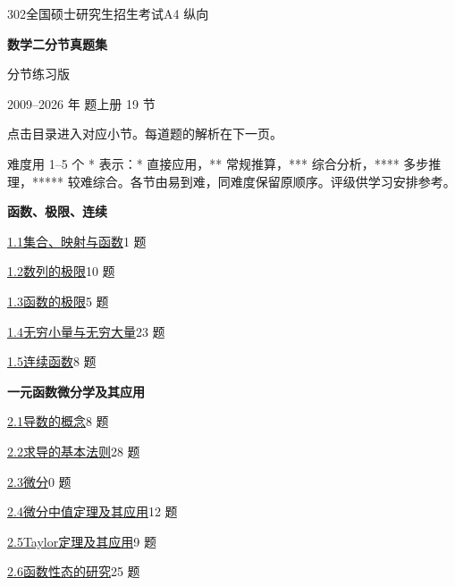 \documentclass[UTF8,zihao=-4,fontset=fandol]{ctexart}
\newcommand{\BankFormat}{A4 纵向}
\newcommand{\BankSubtitle}{分节练习版}
\newcommand{\BankFormat}{4:3 横屏}
\newcommand{\BankSubtitle}{iPad 手写练习版}
\begin{document}
\hypertarget{contents}{}
{\small\textcolor{accent}{302\quad 全国硕士研究生招生考试\hfill \BankFormat}}\par\bigskip
{\huge\bfseries 数学二分节真题集}\par\smallskip
{\large \BankSubtitle}\par\smallskip
{\small 2009--2026 年 题\quad 上册 19 节}\par\smallskip
{\small 点击目录进入对应小节。每道题的解析在下一页。}\par\bigskip
{\small 难度用 1--5 个 * 表示：* 直接应用，** 常规推算，*** 综合分析，**** 多步推理，***** 较难综合。各节由易到难，同难度保留原顺序。评级供学习安排参考。}\par\medskip

\begin{minipage}[t]{0.48\linewidth}
\medskip\textbf{函数、极限、连续}\par
{\small\hyperlink{sec-1.1}{1.1\quad 集合、映射与函数}\hfill 1 题}\par
{\small\hyperlink{sec-1.2}{1.2\quad 数列的极限}\hfill 10 题}\par
{\small\hyperlink{sec-1.3}{1.3\quad 函数的极限}\hfill 5 题}\par
{\small\hyperlink{sec-1.4}{1.4\quad 无穷小量与无穷大量}\hfill 23 题}\par
{\small\hyperlink{sec-1.5}{1.5\quad 连续函数}\hfill 8 题}\par
\medskip\textbf{一元函数微分学及其应用}\par
{\small\hyperlink{sec-2.1}{2.1\quad 导数的概念}\hfill 8 题}\par
{\small\hyperlink{sec-2.2}{2.2\quad 求导的基本法则}\hfill 28 题}\par
{\small\hyperlink{sec-2.3}{2.3\quad 微分}\hfill 0 题}\par
{\small\hyperlink{sec-2.4}{2.4\quad 微分中值定理及其应用}\hfill 12 题}\par
{\small\hyperlink{sec-2.5}{2.5\quad Taylor定理及其应用}\hfill 9 题}\par
{\small\hyperlink{sec-2.6}{2.6\quad 函数性态的研究}\hfill 25 题}\par
\end{minipage}%
\hfill
\end{document}
